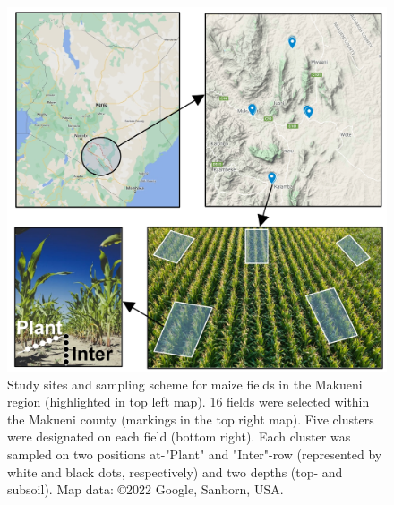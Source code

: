 \begin{refsection}
\begin{figure}[b!]
\centering
\includegraphics[width=1\textwidth]{figures/kenya field sampling.jpg}
\decoRule
\captionsetup{labelfont=bf, justification=justified, singlelinecheck=false, width=1\textwidth}
\caption{Study sites and sampling scheme for maize fields in the Makueni region (highlighted in top left map). 16 fields were selected within the Makueni county (markings in the top right map). Five clusters were designated on each field (bottom right). Each cluster was sampled on two positions at-"Plant" and "Inter"-row (represented by white and black dots, respectively) and two depths (top- and subsoil). Map data: ©2022 Google, Sanborn, USA.}
\label{fig:Kenya_sampling}
\end{figure}



\end{refsection}
